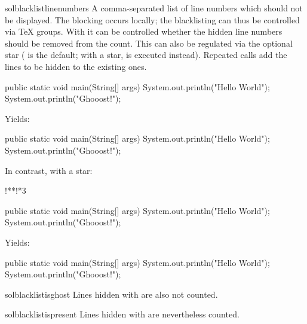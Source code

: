 \documentclass{sopra-base}
\begin{document}
\begin{command}{solblacklistlinenumbers}{\optStar{}}
    A comma-separated list of line numbers which should not be displayed. The blocking occurs locally; the blacklisting can thus be controlled via \TeX{} groups.
    With   it can be controlled whether the hidden line numbers should be removed from the count.
    This can also be regulated via the optional star ( is the default; with a star,  is executed instead). Repeated calls add the lines to be hidden to the existing ones.
\begin{latex}[morekeywords={[5]{\\solblacklistlinenumbers}}]
\begin{java}
public static void main(String[] args){
    System.out.println("Hello World");
    System.out.println("Ghooost!");
}
\end{java}
\end{latex}
Yields: {
\begin{java}
public static void main(String[] args){
    System.out.println("Hello World");
    System.out.println("Ghooost!");
}
\end{java}
}
In contrast, with a star:
\begin{latex}[morekeywords={[5]{\\solblacklistlinenumbers}}]
\solblacklistlinenumbers!**!*{3}
\begin{java}
public static void main(String[] args){
    System.out.println("Hello World");
    System.out.println("Ghooost!");
}
\end{java}
\end{latex}
Yields: {
\begin{java}
public static void main(String[] args){
    System.out.println("Hello World");
    System.out.println("Ghooost!");
}
\end{java}
}
\end{command}

\begin{command}{solblacklistisghost}{}
    Lines hidden with  are also not counted.
\end{command}

\begin{command}{solblacklistispresent}{}
    Lines hidden with  are nevertheless counted.
\end{command}
\end{document}
